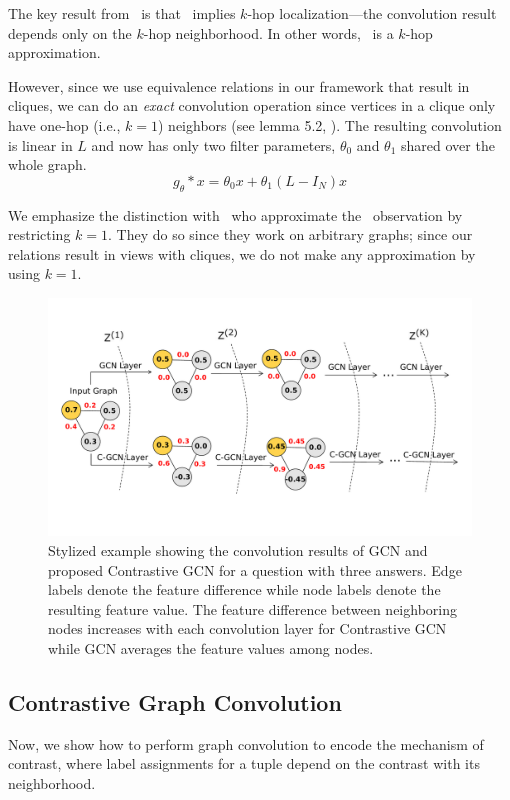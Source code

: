 The key result from~\citet{deferrard} is that~ implies $k$-hop localization---the convolution result depends only on the $k$-hop neighborhood. In other words,~  is a $k$-hop approximation.

However, since we use equivalence relations in our framework that result in cliques, we can do an \textit{exact} convolution operation since vertices in a clique only have one-hop (i.e., $k=1$) neighbors (see lemma 5.2, \cite{Hammond2011}). The resulting convolution is linear in $L$ and now has only two filter parameters, $\theta_{0}$ and $\theta_{1}$ shared over the whole graph.
\begin{equation}
g_{\theta} * x = \theta_{0}x + \theta_{1}\left(L-I_{N} \right)x %
\label{eq:restrictk}
\end{equation}

We emphasize the distinction with~\citet{gcn} who approximate the~\citet{deferrard} observation by restricting $k=1$. They do so since they work on arbitrary graphs; since our relations result in views with cliques, we do not make any approximation by using $k=1$.

\begin{figure}[h]
  \centering
  \includegraphics[scale=0.43]{figures/fig_contrast}
  \caption{\label{fig:contrast}Stylized example showing the convolution results of GCN and proposed Contrastive GCN for a question with three answers. Edge labels denote the feature difference while node labels denote the resulting feature value. The feature difference between neighboring nodes increases with each convolution layer for Contrastive GCN while GCN averages the feature values among nodes. }
\end{figure}

\subsection{Contrastive Graph Convolution}
\label{subsec:contrast}
Now, we show how to perform graph convolution to encode the mechanism of contrast, where label assignments for a tuple depend on the contrast with its neighborhood.

